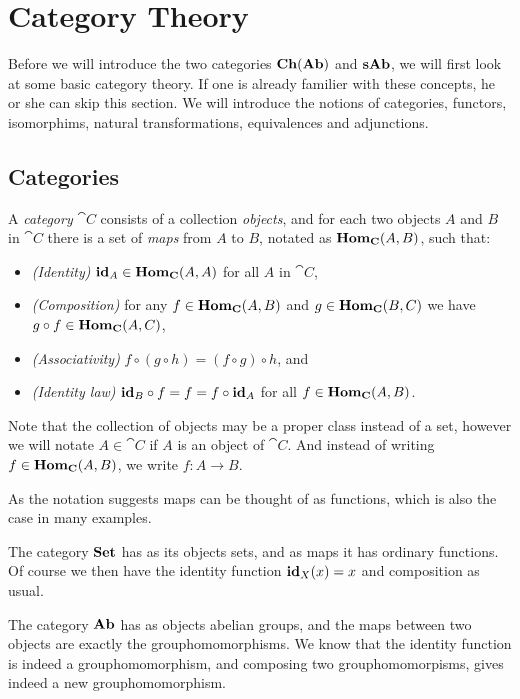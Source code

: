 \section{Category Theory}
\label{sec:Category Theory}
Before we will introduce the two categories $\mathbf{Ch}(\mathbf{Ab})$ and $\mathbf{sAb}$, we will first look at some basic category theory. If one is already familier with these concepts, he or she can skip this section. We will introduce the notions of categories, functors, isomorphims, natural transformations, equivalences and adjunctions.

\subsection{Categories}
\begin{definition}
	A \emph{category} $\cat{C}$ consists of a collection \emph{objects}, and for each two objects $A$ and $B$ in $\cat{C}$ there is a set of \emph{maps}  from $A$ to $B$, notated as $\mathbf{Hom}_{\mathbf{C}}(A, B)$, such that:
	\begin{itemize}
		\item \emph{(Identity)}
			$\mathbf{id}_A \in \mathbf{Hom}_{\mathbf{C}}(A, A)$ for all $A$ in $\cat{C}$,
		\item \emph{(Composition)}
			for any $f \in \mathbf{Hom}_{\mathbf{C}}(A, B)$ and $g \in \mathbf{Hom}_{\mathbf{C}}(B, C)$ we have $g \circ f \in \mathbf{Hom}_{\mathbf{C}}(A, C)$,
		\item \emph{(Associativity)}
			$f \circ (g \circ h) = (f \circ g) \circ h$, and
		\item \emph{(Identity law)}
			$\mathbf{id}_B \circ f = f = f \circ \mathbf{id}_A$ for all $f \in \mathbf{Hom}_{\mathbf{C}}(A, B)$.
	\end{itemize}
\end{definition}

Note that the collection of objects may be a proper class instead of a set, however we will notate $A \in \cat{C}$ if $A$ is an object of $\cat{C}$. And instead of writing $f \in \mathbf{Hom}_{\mathbf{C}}(A, B)$, we write $f: A \to B$.

As the notation suggests maps can be thought of as functions, which is also the case in many examples.

\begin{example}
	The category $\mathbf{Set}$ has as its objects sets, and as maps it has ordinary functions. Of course we then have the identity function $\mathbf{id}_X(x) = x$ and composition as usual.
\end{example}
\begin{example}
	The category $\mathbf{Ab}$ has as objects abelian groups, and the maps between two objects are exactly the grouphomomorphisms. We know that the identity function is indeed a grouphomomorphism, and composing two grouphomomorpisms, gives indeed a new grouphomomorphism.
\end{example}

